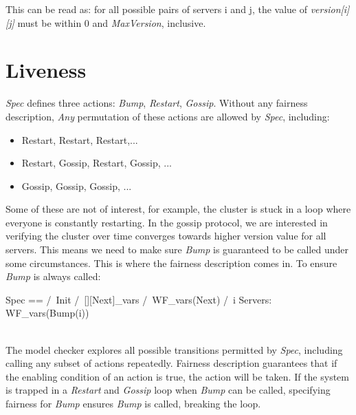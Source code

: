 This can be read as: for all possible pairs of servers i and j, the value of
\textit{version[i][j]} must be within 0 and \textit{MaxVersion}, inclusive.

\section{Liveness}

\textit{Spec} defines three actions: \textit{Bump}, \textit{Restart},
\textit{Gossip}. Without any fairness description, \textit{Any} permutation of
these actions are allowed by \textit{Spec}, including:
\begin{itemize}
    \item Restart, Restart, Restart,...
    \item Restart, Gossip, Restart, Gossip, ... 
    \item Gossip, Gossip, Gossip, ... 
\end{itemize}

Some of these are not of interest, for example, the cluster is stuck in a
loop where everyone is constantly restarting. In the gossip protocol, we are
interested in verifying the cluster over time converges towards higher version
value for all servers. This means we need to make sure \textit{Bump} is
guaranteed to be called under some circumstances. This is where the fairness
description comes in. To ensure \textit{Bump} is always called:\\

\begin{tla}
Spec ==
  /\ Init
  /\ [][Next]_vars
  /\ WF_vars(Next)
  /\ \A i \in Servers: 
    WF_vars(Bump(i))
\end{tla}
\begin{tlatex}
%
%
%
%
%
%
\end{tlatex}
\\

The model checker explores all possible transitions permitted by \textit{Spec}, 
including calling any subset of actions repeatedly.  Fairness description
guarantees that if the enabling condition of an action is true, the action will
be taken. If the system is trapped in a \textit{Restart} and \textit{Gossip}
loop when \textit{Bump} can be called, specifying fairness for \textit{Bump}
ensures \textit{Bump} is called, breaking the loop.\\


